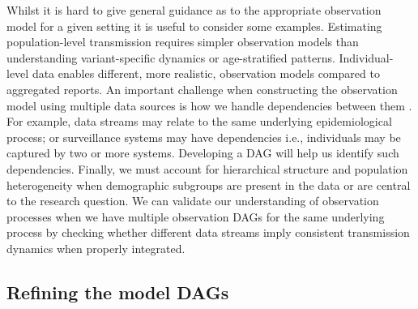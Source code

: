 \documentclass{article}
\begin{document}
Whilst it is hard to give general guidance as to the appropriate observation model for a given setting it is useful to consider some examples.
Estimating population-level transmission requires simpler observation models than understanding variant-specific dynamics or age-stratified patterns.
Individual-level data enables different, more realistic, observation models compared to aggregated reports.
An important challenge when constructing the observation model using multiple data sources is how we handle dependencies between them \cite{deangelis2015four,corbella2025inferring}. For example, data streams may relate to the same underlying epidemiological process; or surveillance systems may have dependencies i.e., individuals may be captured by two or more systems. Developing a \ac{DAG} will help us identify such dependencies.
Finally, we must account for hierarchical structure and population heterogeneity when demographic subgroups are present in the data or are central to the research question. We can validate our understanding of observation processes when we have multiple observation \ac{DAG}s for the same underlying process by checking whether different data streams imply consistent transmission dynamics when properly integrated.

\subsection{Refining the model DAGs} \label{sec:refine-dags}
\end{document}
